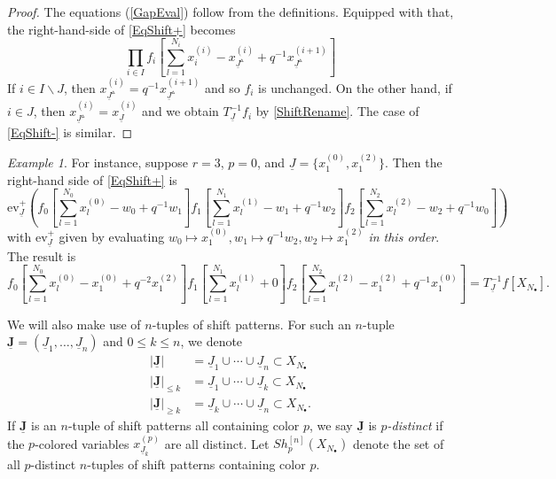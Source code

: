 \documentclass{amsart}
\renewcommand{\triangle}{\vartriangle}
\newcommand{\Ju}{{\underline{J}}}
\theoremstyle{remark}
\newtheorem{ex}[thm]{Example}
\numberwithin{thm}{section}
\numberwithin{equation}{section}
\begin{document}
\begin{proof}
The equations (\ref{GapEval}) follow from the definitions.
Equipped with that, the right-hand-side of \eqref{EqShift+} becomes
\[
\prod_{i\in I}f_i\left[\sum_{l=1}^{N_i} x_i^{(i)}-x_{\Ju^\triangle}^{(i)}+q^{-1}x_{\Ju^\triangle}^{(i+1)}\right]
\]
If $i\in I\backslash J$, then $x_{\Ju^\triangle}^{(i)}=q^{-1}x_{\Ju^\triangle}^{(i+1)}$ and so $f_i$ is unchanged.
On the other hand, if $i\in J$, then $x_{\Ju^\triangle}^{(i)}=x_{\Ju}^{(i)}$ and we obtain $T_{\Ju}^{-1}f_i$ by \eqref{ShiftRename}.
The case of \eqref{EqShift-} is similar.
\end{proof}

\begin{ex}
For instance, suppose $r=3$, $p=0$, and $\Ju=\{x^{(0)}_1,x^{(2)}_1\}$. Then the right-hand side of \eqref{EqShift+} is
$$
\mathrm{ev}_{\Ju}^+\left(f_{0}\left[ \sum_{l=1}^{N_{0}} x_{l}^{(0)}-w_0+q^{-1}w_{1} \right] f_1\left[ \sum_{l=1}^{N_1} x_{l}^{(1)}-w_{1}+q^{-1}w_{2} \right] f_{2}\left[ \sum_{l=1}^{N_{2}} x_{l}^{(2)}-w_{2}+q^{-1}w_0 \right]\right)
$$
with $\mathrm{ev}_{\Ju}^+$ given by evaluating $w_0\mapsto x^{(0)}_1,w_1\mapsto q^{-1}w_2,w_2\mapsto x^{(2)}_1$ \textit{in this order}. The result is
$$
f_{0}\left[ \sum_{l=1}^{N_{0}} x_{l}^{(0)}-x^{(0)}_1+q^{-2}x^{(2)}_1 \right] f_1\left[ \sum_{l=1}^{N_1} x_{l}^{(1)}+0\right] f_{2}\left[ \sum_{l=1}^{N_{2}} x_{l}^{(2)}-x^{(2)}_1+q^{-1}x^{(0)}_1\right] = T_{\Ju}^{-1}f\left[X_{N_\bullet}\right].
$$
\end{ex}

We will also make use of $n$-tuples of shift patterns.
For such an $n$-tuple $\mathbf{\underline{J}}=(\underline{J}_1,\ldots, \underline{J}_n)$ and $0\le k\le n$, we denote
\begin{align*}
    |\mathbf{\underline{J}}|&=\underline{J}_1\cup\cdots\cup\underline{J}_n\subset X_{N_\bullet}\\
    |\mathbf{\underline{J}}|_{\le k}&=\underline{J}_1\cup\cdots\cup\underline{J}_{k}\subset X_{N_\bullet}\\
    |\mathbf{\underline{J}}|_{\ge k}&=\underline{J}_k\cup\cdots\cup\underline{J}_{n}\subset X_{N_\bullet}.
\end{align*}
If $\mathbf{\underline{J}}$ is an $n$-tuple of shift patterns all containing color $p$, we say $\mathbf{\underline{J}}$ is \textit{$p$-distinct} if the $p$-colored variables $x_{\underline{J}_k}^{(p)}$ are all distinct.
Let $Sh_p^{[n]}(X_{N_\bullet})$ denote the set of all $p$-distinct $n$-tuples of shift patterns containing color $p$.
\end{document}
